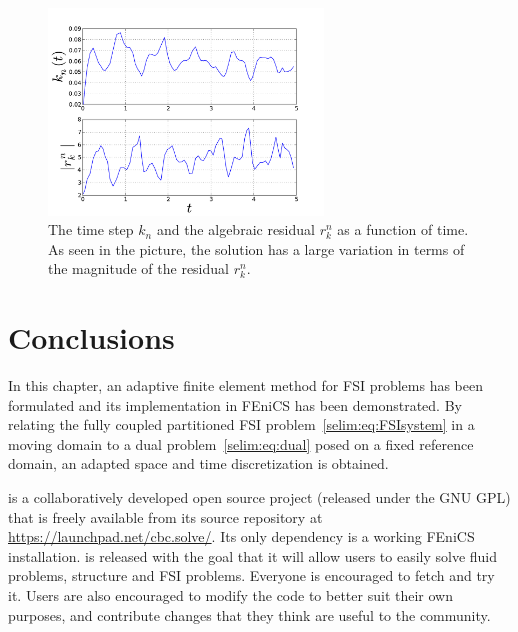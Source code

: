 \begin{figure}[tbp!]
  \begin{center}
    \includegraphics[width=0.65\textwidth]{chapters/selim/pdf/plot.pdf}
    \caption{The time step $k_n$ and the algebraic residual $r_k^n$ as
      a function of time. As seen in the picture, the solution has a large
      variation in terms of the magnitude of the residual $r_k^n$.}
    \label{selim:fig:cavity_timestep}
  \end{center}
\end{figure}

\section{Conclusions}

In this chapter, an adaptive finite element method for FSI problems
has been formulated and its implementation in FEniCS has been
demonstrated. By relating the fully coupled partitioned FSI
problem~\eqref{selim:eq:FSIsystem} in a moving domain to a dual
problem~\eqref{selim:eq:dual} posed on a fixed reference domain, an
adapted space and time discretization is obtained.

 is a collaboratively developed open source project
(released under the GNU GPL) that is freely available from its source
repository at \url{https://launchpad.net/cbc.solve/}. Its only
dependency is a working FEniCS installation.  is
released with the goal that it will allow users to easily solve fluid
problems, structure and FSI problems. Everyone is encouraged to
fetch and try it.  Users are also encouraged to modify the code to
better suit their own purposes, and contribute changes that they think
are useful to the community.
